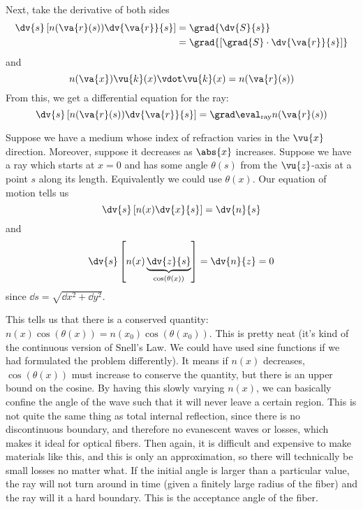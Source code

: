 \documentclass[a4paper,twoside,master.tex]{subfiles}
\begin{document}
Next, take the derivative of both sides
\begin{align}
    \dv{s}\left[ n( \va{r}(s)) \dv{ \va{r}}{s} \right] &= \grad{\dv{S}{s}} \\ &= \grad{\left[ \grad{S} \cdot \dv{ \va{r}}{s} \right]}
\end{align}
and
\begin{equation}
    n( \va{x}) \vu{k}(x) \vdot \vu{k}(x) = n( \va{r}(s))
\end{equation}
From this, we get a differential equation for the ray:
\begin{equation}
    \dv{s}\left[ n( \va{r}(s)) \dv{ \va{r}}{s} \right] = \grad\eval_{\text{ray}} n( \va{r}(s))
\end{equation}

\begin{ex}
    Suppose we have a medium whose index of refraction varies in the $ \vu{x} $ direction. Moreover, suppose it decreases as $ \abs{x} $ increases. Suppose we have a ray which starts at $ x = 0 $ and has some angle $ \theta(s) $ from the $ \vu{z} $-axis at a point $ s $ along its length. Equivalently we could use $ \theta(x) $. Our equation of motion tells us
    \begin{equation}
        \dv{s}\left[ n(x) \dv{x}{s} \right] = \dv{n}{s}
    \end{equation}
    and
    \begin{equation}
        \dv{s}\left[ n(x) \underbrace{\dv{z}{s}}_{\cos(\theta(x))} \right] = \dv{n}{z} = 0
    \end{equation}
    since $ \dd{s} = \sqrt{\dd{x}^2 + \dd{y}^2} $.

    This tells us that there is a conserved quantity: $ n(x) \cos(\theta(x)) = n(x_0) \cos(\theta(x_0)) $. This is pretty neat (it's kind of the continuous version of Snell's Law. We could have used sine functions if we had formulated the problem differently). It means if $ n(x) $ decreases, $ \cos(\theta(x)) $ must increase to conserve the quantity, but there is an upper bound on the cosine. By having this slowly varying $ n(x) $, we can basically confine the angle of the wave such that it will never leave a certain region. This is not quite the same thing as total internal reflection, since there is no discontinuous boundary, and therefore no evanescent waves or losses, which makes it ideal for optical fibers. Then again, it is difficult and expensive to make materials like this, and this is only an approximation, so there will technically be small losses no matter what. If the initial angle is larger than a particular value, the ray will not turn around in time (given a finitely large radius of the fiber) and the ray will it a hard boundary. This is the acceptance angle of the fiber.


\end{ex}
\end{document}
